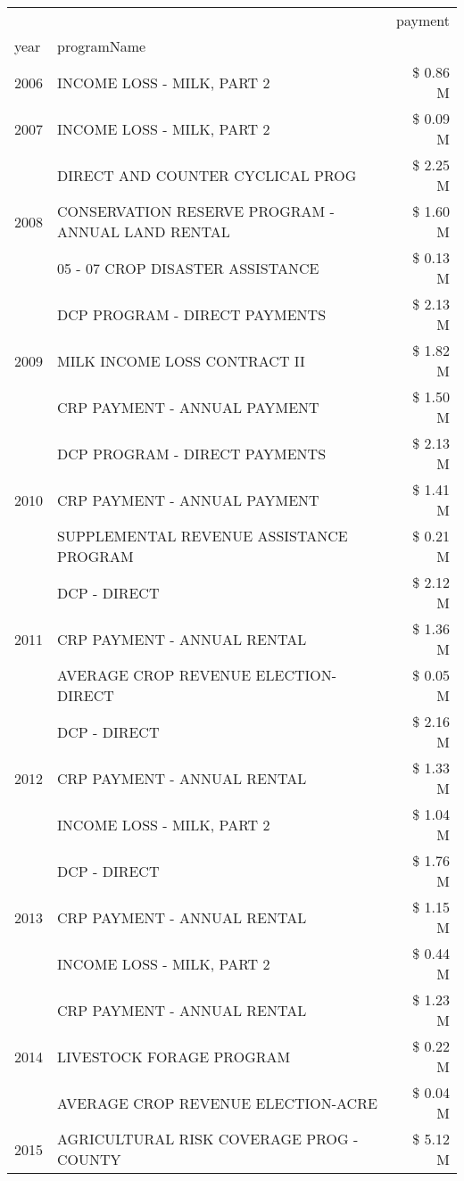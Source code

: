 \begin{tabular}{llr}
\toprule
 &  & payment \\
year & programName &  \\
\midrule
2006 & INCOME LOSS - MILK, PART 2 & \$ 0.86 M \\
\cline{1-3}
2007 & INCOME LOSS - MILK, PART 2 & \$ 0.09 M \\
\cline{1-3}
\multirow[t]{3}{*}{2008} & DIRECT AND COUNTER CYCLICAL PROG & \$ 2.25 M \\
 & CONSERVATION RESERVE PROGRAM - ANNUAL LAND RENTAL & \$ 1.60 M \\
 & 05 - 07 CROP DISASTER ASSISTANCE & \$ 0.13 M \\
\cline{1-3}
\multirow[t]{3}{*}{2009} & DCP PROGRAM - DIRECT PAYMENTS & \$ 2.13 M \\
 & MILK INCOME LOSS CONTRACT II & \$ 1.82 M \\
 & CRP PAYMENT - ANNUAL PAYMENT & \$ 1.50 M \\
\cline{1-3}
\multirow[t]{3}{*}{2010} & DCP PROGRAM - DIRECT PAYMENTS & \$ 2.13 M \\
 & CRP PAYMENT - ANNUAL PAYMENT & \$ 1.41 M \\
 & SUPPLEMENTAL REVENUE ASSISTANCE PROGRAM & \$ 0.21 M \\
\cline{1-3}
\multirow[t]{3}{*}{2011} & DCP - DIRECT & \$ 2.12 M \\
 & CRP PAYMENT - ANNUAL RENTAL & \$ 1.36 M \\
 & AVERAGE CROP REVENUE ELECTION-DIRECT & \$ 0.05 M \\
\cline{1-3}
\multirow[t]{3}{*}{2012} & DCP - DIRECT & \$ 2.16 M \\
 & CRP PAYMENT - ANNUAL RENTAL & \$ 1.33 M \\
 & INCOME LOSS - MILK, PART 2 & \$ 1.04 M \\
\cline{1-3}
\multirow[t]{3}{*}{2013} & DCP - DIRECT & \$ 1.76 M \\
 & CRP PAYMENT - ANNUAL RENTAL & \$ 1.15 M \\
 & INCOME LOSS - MILK, PART 2 & \$ 0.44 M \\
\cline{1-3}
\multirow[t]{3}{*}{2014} & CRP PAYMENT - ANNUAL RENTAL & \$ 1.23 M \\
 & LIVESTOCK FORAGE PROGRAM & \$ 0.22 M \\
 & AVERAGE CROP REVENUE ELECTION-ACRE & \$ 0.04 M \\
\cline{1-3}
\multirow[t]{3}{*}{2015} & AGRICULTURAL RISK COVERAGE PROG - COUNTY & \$ 5.12 M \\

\end{tabular}

